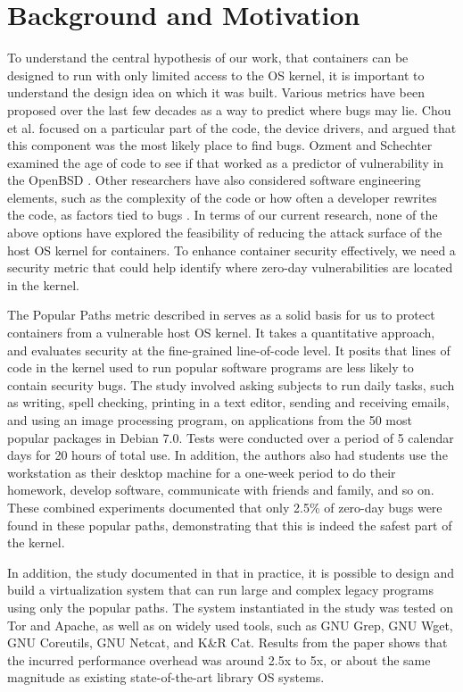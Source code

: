 \section{Background and Motivation}
\label{sec.motivation}
To understand the central hypothesis of our work, that containers can be designed  to run with only limited access to the OS kernel, 
it is important to understand the design idea  on which it was built. Various metrics have been proposed over the last few decades as a way to predict where bugs may lie. 
Chou et al. \cite{Chou} focused on a particular part of the code, the device drivers, and argued that this component was the most likely place to find bugs. 
Ozment and Schechter \cite{Ozment} examined the age of code to see if that worked as a predictor of vulnerability in the OpenBSD \cite{OpenBSD}. 
Other researchers have also considered software engineering elements, such as the complexity of the code or how often a developer rewrites the code, 
as factors tied to bugs \cite{5560680, SAC10, Imtiaz2018TowardsDV, 4459644, Alenezi2015EvaluatingSM}. In terms of our current research, 
none of the above options have explored the feasibility of reducing the attack surface of the host OS kernel for containers. 
To enhance container security effectively, we need a security metric that could help identify where zero-day vulnerabilities are located in the kernel. 

The Popular Paths metric described in \cite{Lock-in-Pop} serves as a solid basis for us to protect containers from a vulnerable host OS kernel. 
It takes a quantitative approach, and evaluates security at the fine-grained  line-of-code level. 
It posits that lines of code in the kernel used to run popular software programs are less  likely  to contain security bugs. 
The study involved asking subjects to run  daily tasks, such as writing, spell checking, printing in a text editor, sending and receiving emails, and using an image processing program, 
on applications from the 50 most popular packages in Debian 7.0. Tests were conducted over a period of 5 calendar days for 20 hours of total use. 
In addition, the authors also had students use the workstation as their desktop machine for a one-week period to do their homework, develop software, communicate with friends 
and family, and so on. 
These combined experiments documented that only 2.5\% of zero-day bugs were found in these popular paths, demonstrating that this is indeed the safest part of the kernel.  

In addition, the study documented in \cite{Lock-in-Pop} that in practice, it is possible to design and build a virtualization system that can run large and complex legacy programs 
using only the popular paths. 
The system instantiated in the study was tested  on Tor and Apache, as well as on widely used tools, such as GNU Grep, GNU Wget, GNU Coreutils, GNU Netcat, and K\&R Cat. 
Results from the paper \cite{Lock-in-Pop} shows that the incurred performance overhead was around 2.5x to 5x, or about the same magnitude as existing state-of-the-art library OS systems. 

